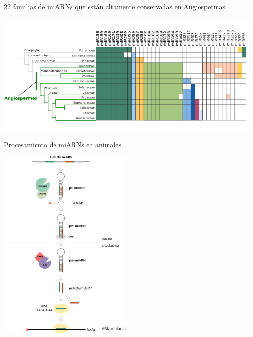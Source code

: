 \documentclass{beamer}
\begin{document}
\begin{frame}{22 familias de miARNs que están altamente conservadas en Angiospermas}
	\begin{center}
		\includegraphics[width=1\textwidth]{img/familias_miRNAs_conservados_angiospermas.png}
	\end{center}
\end{frame}

\begin{frame}{Procesamiento de miARNs en animales}
	\begin{center}
		\includegraphics[width=0.5\textwidth]{img/procesamiento_animales.png}
	\end{center}
\end{frame}
\end{document}

